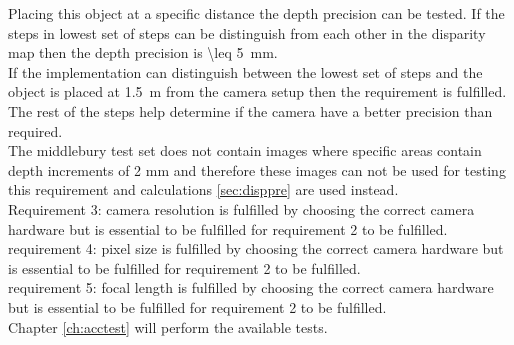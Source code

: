 Placing this object at a specific distance the depth precision can be tested. If the steps in lowest set of steps can be distinguish from each other in the disparity map then the depth precision is \SI{\leq 5}{\milli\meter}.\\
If the implementation can distinguish between the lowest set of steps and the object is placed at \SI{1.5}{\meter} from the camera setup then the requirement is fulfilled. The rest of the steps help determine if the camera have a better precision than required.\\
The middlebury test set does not contain images where specific areas contain depth increments of 2 mm and therefore these images can not be used for testing this requirement and calculations \vref{sec:disppre} are used instead.\\

Requirement 3: camera resolution is fulfilled by choosing the correct camera hardware but is essential to be fulfilled for requirement 2 to be fulfilled.\\

requirement 4: pixel size is fulfilled by choosing the correct camera hardware but is essential to be fulfilled for requirement 2 to be fulfilled.\\

requirement 5: focal length is fulfilled by choosing the correct camera hardware but is essential to be fulfilled for requirement 2 to be fulfilled.\\

Chapter \vref{ch:acctest} will perform the available tests.

